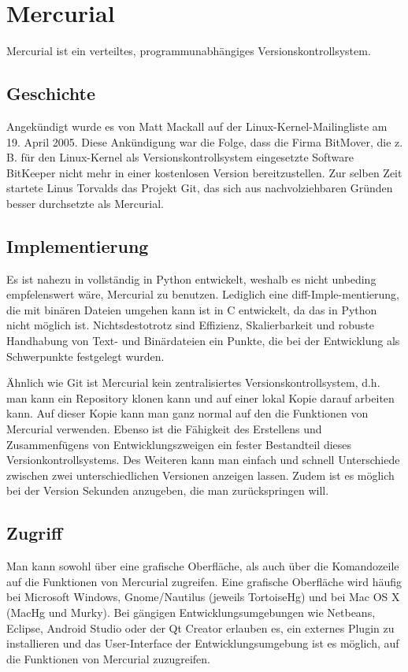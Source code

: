 \section{Mercurial}
Mercurial ist ein verteiltes, programmunabhängiges Versionskontrollsystem.
\subsection{Geschichte}
Angekündigt wurde es von Matt Mackall auf der Linux-Kernel-Mailingliste am 19. April 2005. Diese Ankündigung war die Folge, dass die Firma BitMover, die z. B. für den Linux-Kernel als Versionskontrollsystem eingesetzte Software BitKeeper nicht mehr in einer kostenlosen Version bereitzustellen. Zur selben Zeit startete Linus Torvalds das Projekt Git, das sich aus nachvolziehbaren Gründen besser durchsetzte als Mercurial.
\subsection{Implementierung}
Es ist nahezu in vollständig in Python entwickelt, weshalb es nicht unbeding empfelenswert wäre, Mercurial zu benutzen. Lediglich eine diff-Imple-mentierung, die mit binären Dateien umgehen kann ist in C entwickelt, da das in Python nicht möglich ist. Nichtsdestotrotz sind Effizienz, Skalierbarkeit und robuste Handhabung von Text- und Binärdateien ein Punkte, die bei der Entwicklung als Schwerpunkte festgelegt wurden.

Ähnlich wie Git ist Mercurial kein zentralisiertes Versionskontrollsystem, d.h. man kann ein Repository klonen kann und auf einer lokal Kopie darauf arbeiten kann. Auf dieser Kopie kann man ganz normal auf den die Funktionen von Mercurial verwenden. Ebenso ist die Fähigkeit des Erstellens und Zusammenfügens von Entwicklungszweigen ein fester Bestandteil dieses Versionkontrollsystems. Des Weiteren kann man einfach und schnell Unterschiede zwischen zwei unterschiedlichen Versionen anzeigen lassen. Zudem ist es möglich bei der Version Sekunden anzugeben, die man zurückspringen will.
\subsection{Zugriff}
Man kann sowohl über eine grafische Oberfläche, als auch über die Komandozeile auf die Funktionen von Mercurial zugreifen. Eine grafische Oberfläche wird häufig bei Microsoft Windows, Gnome/Nautilus (jeweils TortoiseHg) und bei Mac OS X (MacHg und Murky). Bei gängigen Entwicklungsumgebungen wie Netbeans, Eclipse, Android Studio oder der Qt Creator erlauben es, ein externes Plugin zu installieren und das User-Interface der Entwicklungsumgebung ist es möglich, auf die Funktionen von Mercurial zuzugreifen.
